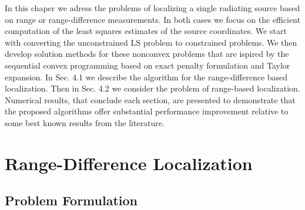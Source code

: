 \label{chapter:scp}

%
%
%
%


In this chaper we adress the problems of localizing a single radiating source based on range or range-difference measurements. In both cases we focus on the efficient computation of the least squares estimates of the source coordinates. We start with converting the unconstrained LS problem to  constrained problems. We then develop solution methods for these nonconvex problems that are ispired by the sequential convex programming based on exact penalty formulation and Taylor expansion. In Sec. 4.1 we describe the  algorithm for the range-difference based localization. Then in Sec. 4.2 we consider the problem of range-based localization. Numerical results, that conclude each section, are presented to demonstrate that the proposed algorithms offer substantial performance improvement relative to some best known results from the literature.



\section{Range-Difference Localization}
\subsection{Problem Formulation}

